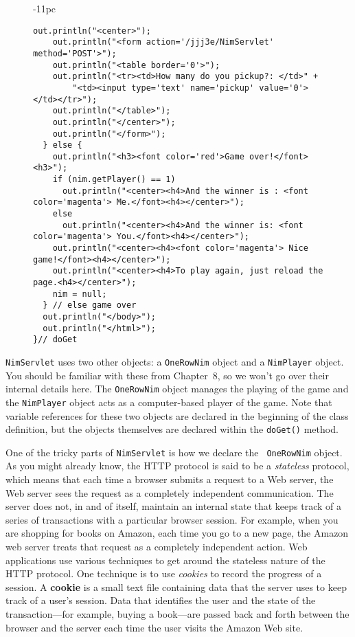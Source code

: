 {{{{\begin{figure}[p]
\begin{jjjlistingleft}[37pc]{-11pc}
\begin{lstlisting}[basicstyle=\scriptsize]
    out.println("<center>");
    out.println("<form action='/jjj3e/NimServlet' method='POST'>");
    out.println("<table border='0'>");
    out.println("<tr><td>How many do you pickup?: </td>" +
        "<td><input type='text' name='pickup' value='0'></td></tr>");
    out.println("</table>");
    out.println("</center>");
    out.println("</form>");
  } else {
    out.println("<h3><font color='red'>Game over!</font><h3>");
    if (nim.getPlayer() == 1)
      out.println("<center><h4>And the winner is : <font color='magenta'> Me.</font><h4></center>");
    else
      out.println("<center><h4>And the winner is: <font color='magenta'> You.</font><h4></center>");
    out.println("<center><h4><font color='magenta'> Nice game!</font><h4></center>");
    out.println("<center><h4>To play again, just reload the page.<h4></center>");
    nim = null;
  } // else game over
  out.println("</body>");
  out.println("</html>");
}// doGet
\end{lstlisting}
\end{jjjlistingleft}
\end{figure}

{\tt NimServlet} uses two other objects: a {\tt OneRowNim} object and
a {\tt NimPlayer} object.  You should be familiar with these from
Chapter~8, so we won't go over their internal details here. The
{\tt OneRowNim} object manages the playing of the game and the
{\tt NimPlayer} object acts as a computer-based player of the game.
Note that variable references for these two objects are declared in
the beginning of the class definition, but the objects themselves
are declared within the {\tt doGet()} method.

One of the tricky parts of {\tt NimServlet} is how we declare the {\tt
OneRowNim} object.  As you might already know, the HTTP protocol is said to be a
{\em stateless} protocol, which means that each time a browser submits
a request to a Web server, the Web server sees the request as a
completely independent communication. The server does not, in and of
itself, maintain an internal state that keeps track of a series of
transactions with a particular browser session.  For example, when you
are shopping for books on Amazon, each time you go to a new page, the
Amazon web server treats that request as a completely independent
action.  Web applications use various techniques to get around the
stateless nature of the HTTP protocol. One technique is to use {\em
cookies} to record the progress of a session. A {\bf cookie} is a
small text file containing data that the server uses to keep track of
a user's session. Data that identifies the user and the state of the
transaction---for example, buying a book---are passed back and forth
between the browser and the server each time the user visits the
Amazon Web site.

}}}}
